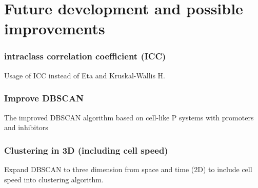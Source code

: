 \documentclass[a4paper,headsepline,footsepline,fontsize=11pt,BCOR=12mm,DIV=12]{report}
\begin{document}
\section{Future development and possible improvements} 

\subsubsection{intraclass correlation coefficient (ICC)}
Usage of ICC instead of Eta and Kruskal-Wallis H.

\subsubsection{Improve DBSCAN}
The improved DBSCAN algorithm based on cell-like P systems with promoters and inhibitors

\subsubsection{Clustering in 3D (including cell speed)}
Expand DBSCAN to three dimension from space and time (2D) to include cell speed into clustering algorithm.



{}

\listoffigures

\listoftables

\printglossary[title=List of Acronyms, type=\acronymtype]

\printglossary[title=List of Terms]
\end{document}

